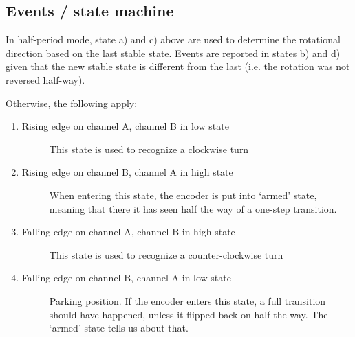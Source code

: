 \documentclass[a4paper,8pt,english]{sphinxmanual}
\begin{document}
\subsection{Events / state machine}
\label{input/devices/rotary-encoder:events-state-machine}
In half-period mode, state a) and c) above are used to determine the
rotational direction based on the last stable state. Events are reported in
states b) and d) given that the new stable state is different from the last
(i.e. the rotation was not reversed half-way).

Otherwise, the following apply:
\begin{enumerate}
\item {} \begin{description}
\item[{Rising edge on channel A, channel B in low state}] \leavevmode
This state is used to recognize a clockwise turn

\end{description}

\item {} \begin{description}
\item[{Rising edge on channel B, channel A in high state}] \leavevmode
When entering this state, the encoder is put into `armed' state,
meaning that there it has seen half the way of a one-step transition.

\end{description}

\item {} \begin{description}
\item[{Falling edge on channel A, channel B in high state}] \leavevmode
This state is used to recognize a counter-clockwise turn

\end{description}

\item {} \begin{description}
\item[{Falling edge on channel B, channel A in low state}] \leavevmode
Parking position. If the encoder enters this state, a full transition
should have happened, unless it flipped back on half the way. The
`armed' state tells us about that.

\end{description}

\end{enumerate}
\end{document}
